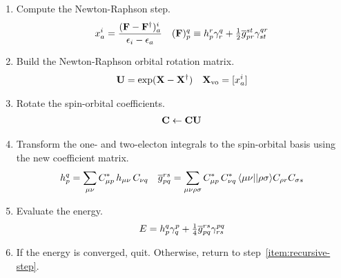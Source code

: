 \documentclass[11pt]{article}
\begin{document}
\begin{enumerate}
\item
Compute the Newton-Raphson step.
\begin{align}
  x_a^i
=
  \frac {(\mathbf{F} - \mathbf{F}^\dagger)_a^i}{\epsilon _i - \epsilon _a}
&&
  (\mathbf{F})_p^q
\equiv
  h_p^r
  \gamma ^q_r
+
  \tfrac{1}{2}
  \overline{g}_{pr}^{st}
  \gamma ^{qr}_{st}
\end{align}

\item
Build the Newton-Raphson orbital rotation matrix.
\begin{align}
  \mathbf{U}
=
  \mathrm{exp}(\mathbf{X} - \mathbf{X}^\dagger)
&&
  \mathbf{X}_{\mathrm{vo}}
=
  [x_a^i]
\end{align}

\item
Rotate the spin-orbital coefficients.
\begin{align}
  \mathbf{C}
\leftarrow
  \mathbf{C}\mathbf{U}
\end{align}

\item
Transform the one- and two-electon integrals to the spin-orbital basis using the new coefficient matrix.
\begin{align}
  h_p^q
=
  \sum_{\mu\nu}
  C_{\mu p}^*\,
  h_{\mu\nu}\,
  C_{\nu q}
&&
  \ol{g}_{pq}^{rs}
=
  \sum_{\mu\nu\rh\si}
  C_{\mu p}^*\,
  C_{\nu q}^*\,
  \ip{\mu \nu||\rh\si}
  C_{\rh r}
  C_{\si s}
\end{align}

\item
Evaluate the energy.
\begin{align}
  E
=
  h_p^q
  \gamma ^p_q
+
  \tfrac{1}{4}
  \overline{g}_{pq}^{rs}
  \gamma ^{pq}_{rs}
\end{align}

\item
If the energy is converged, quit.
Otherwise, return to step~\ref{item:recursive-step}.
\end{enumerate}
\end{document}
